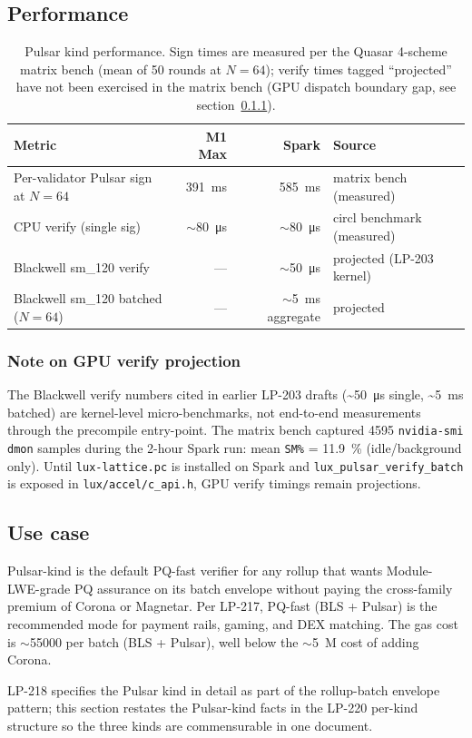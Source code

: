 \subsection{Performance}

\begin{table}[h]
\centering
\small
\begin{tabular}{@{}lrrl@{}}
\toprule
\textbf{Metric} & \textbf{M1 Max} & \textbf{Spark} & \textbf{Source} \\
\midrule
Per-validator Pulsar sign at $N{=}64$ & \SI{391}{\milli\second} & \SI{585}{\milli\second} & matrix bench (measured)~\cite{parityaudit} \\
CPU verify (single sig) & $\sim$\SI{80}{\micro\second} & $\sim$\SI{80}{\micro\second} & circl benchmark (measured) \\
Blackwell sm\_120 verify & --- & $\sim$\SI{50}{\micro\second} & projected (LP-203 kernel) \\
Blackwell sm\_120 batched ($N{=}64$) & --- & $\sim$\SI{5}{\milli\second} aggregate & projected \\
\bottomrule
\end{tabular}
\caption{Pulsar kind performance. Sign times are measured per
the Quasar 4-scheme matrix bench (mean of 50 rounds at $N{=}64$);
verify times tagged ``projected'' have not been exercised in the
matrix bench (GPU dispatch boundary gap, see
section~\ref{sec:pulsar-perf-note}).}
\label{tab:pulsar-perf}
\end{table}

\subsubsection{Note on GPU verify projection}
\label{sec:pulsar-perf-note}

The Blackwell verify numbers cited in earlier LP-203 drafts
(\textasciitilde\SI{50}{\micro\second} single,
\textasciitilde\SI{5}{\milli\second} batched) are kernel-level
micro-benchmarks, not end-to-end measurements through the
precompile entry-point. The matrix bench captured \num{4595}
\texttt{nvidia-smi dmon} samples during the 2-hour Spark run:
mean \texttt{SM\%} = \SI{11.9}{\percent} (idle/background only).
Until \texttt{lux-lattice.pc} is installed on Spark and
\texttt{lux\_pulsar\_verify\_batch} is exposed in
\texttt{lux/accel/c\_api.h}, GPU verify timings remain
projections.

\subsection{Use case}

Pulsar-kind is the default PQ-fast verifier for any rollup that
wants Module-LWE-grade PQ assurance on its batch envelope
without paying the cross-family premium of Corona or Magnetar.
Per LP-217, PQ-fast (BLS + Pulsar) is the recommended mode for
payment rails, gaming, and DEX matching. The gas cost is
$\sim$\SI{55000}{} per batch (BLS + Pulsar), well below the
$\sim$\SI{5}{M} cost of adding Corona.

LP-218 specifies the Pulsar kind in detail as part of the
rollup-batch envelope pattern; this section restates the
Pulsar-kind facts in the LP-220 per-kind structure so the three
kinds are commensurable in one document.
